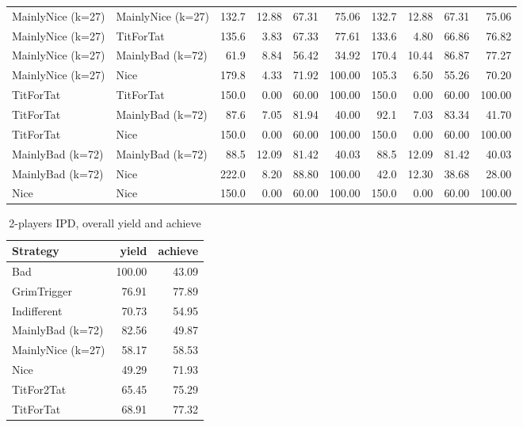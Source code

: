 \documentclass[journal,10pt,twoside]{IEEEtran}
\begin{document}
\begin{table}[ht]
\begin{tabular}{ll|rrrr|rrrr}
        MainlyNice (k=27) & MainlyNice (k=27) & 132.7 & 12.88 &  67.31 &      75.06 & 132.7 & 12.88 &  67.31 &      75.06 \\
        MainlyNice (k=27) & TitForTat         & 135.6 &  3.83 &  67.33 &      77.61 & 133.6 &  4.80 &  66.86 &      76.82 \\
        MainlyNice (k=27) & MainlyBad (k=72)  &  61.9 &  8.84 &  56.42 &      34.92 & 170.4 & 10.44 &  86.87 &      77.27 \\
        MainlyNice (k=27) & Nice              & 179.8 &  4.33 &  71.92 &     100.00 & 105.3 &  6.50 &  55.26 &      70.20 \\
        TitForTat         & TitForTat         & 150.0 &  0.00 &  60.00 &     100.00 & 150.0 &  0.00 &  60.00 &     100.00 \\
        TitForTat         & MainlyBad (k=72)  &  87.6 &  7.05 &  81.94 &      40.00 &  92.1 &  7.03 &  83.34 &      41.70 \\
        TitForTat         & Nice              & 150.0 &  0.00 &  60.00 &     100.00 & 150.0 &  0.00 &  60.00 &     100.00 \\
        MainlyBad (k=72)  & MainlyBad (k=72)  &  88.5 & 12.09 &  81.42 &      40.03 &  88.5 & 12.09 &  81.42 &      40.03 \\
        MainlyBad (k=72)  & Nice              & 222.0 &  8.20 &  88.80 &     100.00 &  42.0 & 12.30 &  38.68 &      28.00 \\
        Nice              & Nice              & 150.0 &  0.00 &  60.00 &     100.00 & 150.0 &  0.00 &  60.00 &     100.00 \\ \bottomrule
    \end{tabular}
\end{table}

\begin{table}[ht]
    \caption{2-players IPD, overall yield and achieve}
    \label{tab:ipd2pavg}
    \centering
    \begin{tabular}{l|rr} \toprule
        Strategy          &  yield & achieve \\ \midrule
        Bad               & 100.00 &   43.09 \\
        GrimTrigger       &  76.91 &   77.89 \\
        Indifferent       &  70.73 &   54.95 \\
        MainlyBad (k=72)  &  82.56 &   49.87 \\
        MainlyNice (k=27) &  58.17 &   58.53 \\
        Nice              &  49.29 &   71.93 \\
        TitFor2Tat        &  65.45 &   75.29 \\
        TitForTat         &  68.91 &   77.32 \\ \bottomrule
    \end{tabular}
\end{table}
\end{document}
